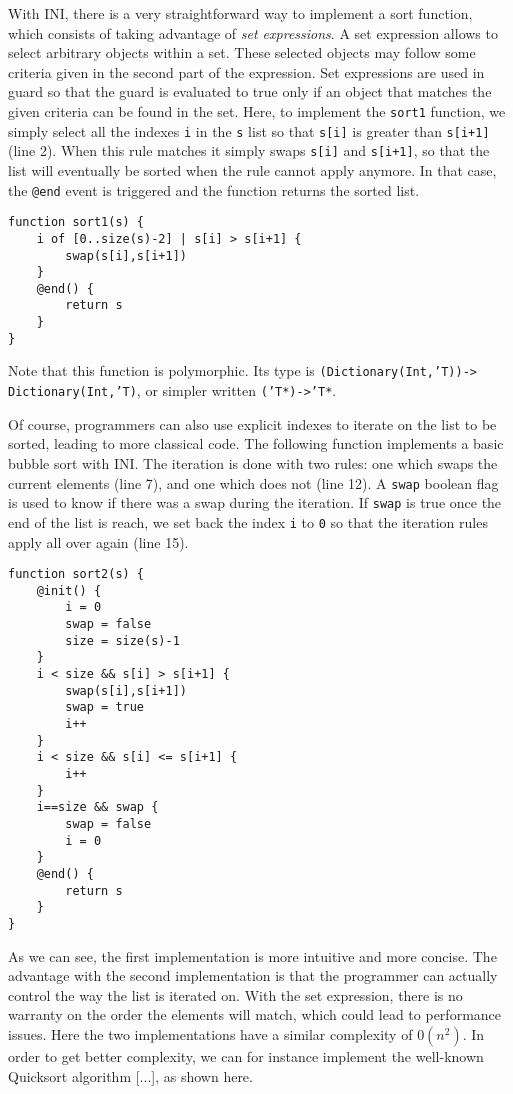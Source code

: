 \documentclass[11pt]{report}
\begin{document}
With INI, there is a very straightforward way to implement a sort function, which consists of taking advantage of \emph{set expressions}. A set expression allows to select arbitrary objects within a set. These selected objects may follow some criteria given in the second part of the expression. Set expressions are used in guard so that the guard is evaluated to true only if an object that matches the given criteria can be found in the set. Here, to implement the \texttt{sort1} function, we simply select all the indexes \texttt{i} in the \texttt{s} list so that \texttt{s[i]} is greater than \texttt{s[i+1]} (line 2). When this rule matches it simply swaps \texttt{s[i]} and \texttt{s[i+1]}, so that the list will eventually be sorted when the rule cannot apply anymore. In that case, the \texttt{@end} event is triggered and the function returns the sorted list.

\begin{lstlisting}
function sort1(s) {
	i of [0..size(s)-2] | s[i] > s[i+1] {
		swap(s[i],s[i+1])
	}
	@end() {
		return s
	}
}
\end{lstlisting}

Note that this function is polymorphic. Its type is \texttt{(Dictionary(Int,'T))->} \texttt{Dictionary(Int,'T)}, or simpler written \texttt{('T*)->'T*}.

Of course, programmers can also use explicit indexes to iterate on the list to be sorted, leading to more classical code. The following function implements a basic bubble sort with INI. The iteration is done with two rules: one which swaps the current elements (line 7), and one which does not (line 12). A \texttt{swap} boolean flag is used to know if there was a swap during the iteration. If \texttt{swap} is true once the end of the list is reach, we set back the index \texttt{i} to \texttt{0} so that the iteration rules apply all over again (line 15).

\begin{lstlisting}
function sort2(s) {
	@init() {
		i = 0
		swap = false
		size = size(s)-1
	}
	i < size && s[i] > s[i+1] {
		swap(s[i],s[i+1])
		swap = true
		i++
	}
	i < size && s[i] <= s[i+1] {
		i++
	}
	i==size && swap {
		swap = false
		i = 0
	}
	@end() {
		return s
	}
}
\end{lstlisting}

As we can see, the first implementation is more intuitive and more concise. The advantage with the second implementation is that the programmer can actually control the way the list is iterated on. With the set expression, there is no warranty on the order the elements will match, which could lead to performance issues. Here the two implementations have a similar complexity of $0(n^2)$. In order to get better complexity, we can for instance implement the well-known Quicksort algorithm [...], as shown here.
\end{document}
